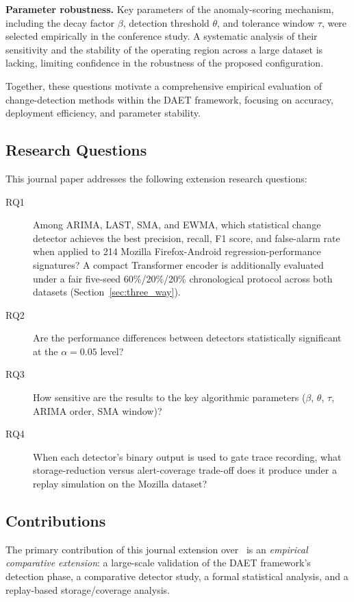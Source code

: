 \documentclass[pdflatex,sn-nature]{sn-jnl}
\theoremstyle{thmstyleone}%
\begin{document}
\textbf{Parameter robustness.}
Key parameters of the anomaly-scoring mechanism, including the decay factor
$\beta$, detection threshold $\theta$, and tolerance window $\tau$, were
selected empirically in the conference study.
A systematic analysis of their sensitivity and the stability of the operating
region across a large dataset is lacking, limiting confidence in the robustness
of the proposed configuration.

Together, these questions motivate a comprehensive empirical evaluation of
change-detection methods within the DAET framework, focusing on accuracy,
deployment efficiency, and parameter stability.


\subsection{Research Questions}\label{sec:intro:rqs}

This journal paper addresses the following extension research questions:

\begin{description}
  \item[RQ1] Among ARIMA, LAST, SMA, and EWMA, which statistical change detector achieves the best
    precision, recall, F1 score, and false-alarm rate when applied to 214
    Mozilla Firefox-Android regression-performance signatures?
    A compact Transformer encoder is additionally evaluated under a fair
    five-seed 60\%/20\%/20\% chronological protocol across both datasets
    (Section~\ref{sec:three_way}).
  \item[RQ2] Are the performance differences between detectors statistically
    significant at the $\alpha=0.05$ level?
  \item[RQ3] How sensitive are the results to the key algorithmic parameters
    ($\beta$, $\theta$, $\tau$, ARIMA order, SMA window)?
  \item[RQ4] When each detector's binary output is used to gate trace recording,
    what storage-reduction versus alert-coverage trade-off does it produce under
    a replay simulation on the Mozilla dataset?
\end{description}

\subsection{Contributions}\label{sec:intro:contrib}

The primary contribution of this journal extension over~\cite{10197790} is an
\emph{empirical comparative extension}: a large-scale validation of the DAET
framework's detection phase, a comparative detector study, a formal statistical
analysis, and a replay-based storage/coverage analysis.
\end{document}
